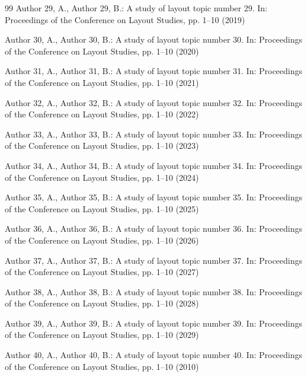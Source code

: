 \documentclass[10pt,letterpaper]{article}
\begin{document}
\begin{thebibliography}{99}
 Author 29, A., Author 29, B.: A study of layout topic number 29. In: Proceedings of the Conference on Layout Studies, pp. 1--10 (2019)

 Author 30, A., Author 30, B.: A study of layout topic number 30. In: Proceedings of the Conference on Layout Studies, pp. 1--10 (2020)

 Author 31, A., Author 31, B.: A study of layout topic number 31. In: Proceedings of the Conference on Layout Studies, pp. 1--10 (2021)

 Author 32, A., Author 32, B.: A study of layout topic number 32. In: Proceedings of the Conference on Layout Studies, pp. 1--10 (2022)

 Author 33, A., Author 33, B.: A study of layout topic number 33. In: Proceedings of the Conference on Layout Studies, pp. 1--10 (2023)

 Author 34, A., Author 34, B.: A study of layout topic number 34. In: Proceedings of the Conference on Layout Studies, pp. 1--10 (2024)

 Author 35, A., Author 35, B.: A study of layout topic number 35. In: Proceedings of the Conference on Layout Studies, pp. 1--10 (2025)

 Author 36, A., Author 36, B.: A study of layout topic number 36. In: Proceedings of the Conference on Layout Studies, pp. 1--10 (2026)

 Author 37, A., Author 37, B.: A study of layout topic number 37. In: Proceedings of the Conference on Layout Studies, pp. 1--10 (2027)

 Author 38, A., Author 38, B.: A study of layout topic number 38. In: Proceedings of the Conference on Layout Studies, pp. 1--10 (2028)

 Author 39, A., Author 39, B.: A study of layout topic number 39. In: Proceedings of the Conference on Layout Studies, pp. 1--10 (2029)

 Author 40, A., Author 40, B.: A study of layout topic number 40. In: Proceedings of the Conference on Layout Studies, pp. 1--10 (2010)

\end{thebibliography}
\end{document}
